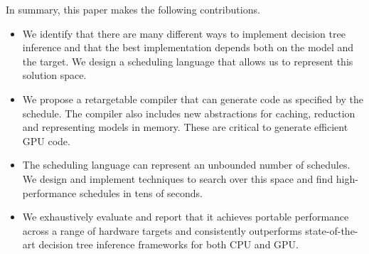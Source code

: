 In summary, this paper makes the following contributions.
\begin{itemize}
  \item We identify that there are many different ways to implement  
  decision tree inference and that the best implementation depends both on the model
  and the target. We design a scheduling language that 
  allows us to represent this solution space. 
  \item We propose a retargetable compiler that can generate code as specified by 
  the schedule. The compiler also includes new abstractions for caching,
  reduction and representing models in memory. These are critical to generate 
  efficient GPU code.
  \item The scheduling language can represent an unbounded number of schedules. 
  We design and implement techniques to search over this space and find high-performance 
  schedules in tens of seconds. 
  \item We exhaustively evaluate \Treebeard{} and report that it achieves 
  portable performance across a range of hardware targets and consistently outperforms
  state-of-the-art decision tree inference frameworks for both CPU and GPU.
\end{itemize}
